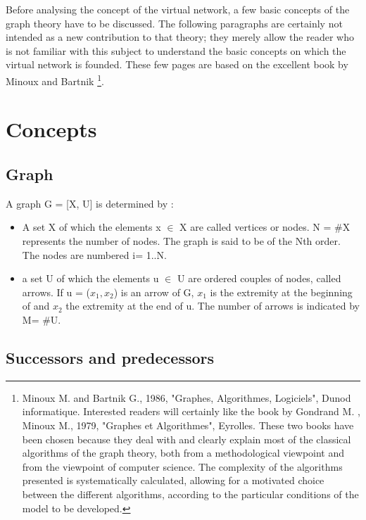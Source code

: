
Before analysing the concept of the virtual network, a few basic concepts of the
graph theory have to be discussed.  The following paragraphs are certainly not
intended as a new contribution to that theory; they merely allow the reader who
is not familiar with this subject to understand the basic concepts on
which the virtual network is founded.  These few pages are based on the
excellent book by Minoux and Bartnik \footnote {Minoux M. and Bartnik G., 1986,
"Graphes, Algorithmes, Logiciels", Dunod informatique.  Interested readers will
certainly like the book by Gondrand M. , Minoux M., 1979, "Graphes et
Algorithmes", Eyrolles.  These two books have been chosen because they deal with
and clearly explain most of the classical algorithms of the graph theory, both
from a methodological viewpoint and from the viewpoint of computer science.  The
complexity of the algorithms presented is systematically calculated, allowing for a
motivated choice between the different algorithms, according to the particular
conditions of the model to be developed.}.




\section{Concepts}

\subsection{Graph}

A graph G = [X, U] is determined by :

\begin{itemize}
\item A set X of which the elements x $\in$ X are called vertices or nodes.
N = \#X  represents the number of nodes. The graph is said to be of the Nth
order.  The nodes are numbered i= 1..N.
\item a set U of which the elements u $\in$ U are ordered couples of nodes,
called arrows. If u = ($x_1,x_2$) is an arrow of G, $x_1$ is the extremity at
the beginning of and $x_2$ the extremity at the end of u. The number of arrows
is indicated by M= \#U.
\end{itemize}




\subsection{Successors and predecessors}


